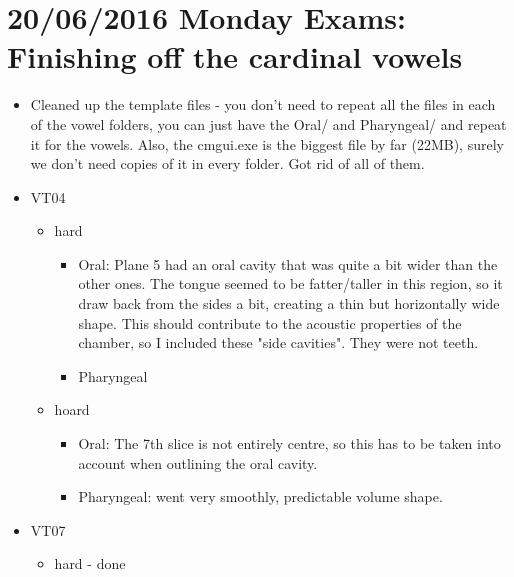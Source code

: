 \documentclass{article}
\begin{document}
\section*{20/06/2016 Monday Exams: Finishing off the cardinal vowels}
\begin{itemize}
    
    \item Cleaned up the template files - you don't need to repeat all the files in each of the vowel folders, you can just have the Oral/ and Pharyngeal/ and repeat it for the vowels. Also, the cmgui.exe is the biggest file by far (22MB), surely we don't need copies of it in every folder. Got rid of all of them.
    
    \item VT04
    \begin{itemize}
        \item hard
        \begin{itemize}
            \item Oral: Plane 5 had an oral cavity that was quite a bit wider than the other ones. The tongue seemed to be fatter/taller in this region, so it draw back from the sides a bit, creating a thin but horizontally wide shape. This should contribute to the acoustic properties of the chamber, so I included these "side cavities". They were not teeth.
            \item Pharyngeal
        \end{itemize}
        \item hoard
        \begin{itemize}
            \item Oral: The 7th slice is not entirely centre, so this has to be taken into account when outlining the oral cavity.
            \item Pharyngeal: went very smoothly, predictable volume shape.
        \end{itemize}
    \end{itemize}
    
    \item VT07
    \begin{itemize}
        \item hard - done
    \end{itemize}
    
\end{itemize}
\end{document}
